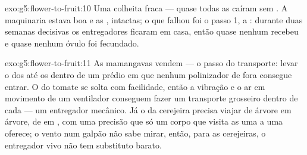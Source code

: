 \begin{solution}{exo:g5:flower-to-fruit:10}
Uma colheita fraca --- quase todas as  caíram sem . A
maquinaria estava boa e as , intactas; o que falhou foi o
passo 1, a : durante duas semanas decisivas os
entregadores ficaram em casa, então quase nenhum  recebeu
 e quase nenhum óvulo foi fecundado.
\end{solution}

\begin{solution}{exo:g5:flower-to-fruit:11}
As mamangavas vendem  --- o passo do transporte: levar o
 dos  até os  dentro de um prédio em que nenhum
polinizador de fora consegue entrar. O  do tomate se solta com
facilidade, então a vibração e o ar em movimento de um ventilador
conseguem fazer um transporte grosseiro dentro de cada  --- um
entregador mecânico. Já o  da cerejeira precisa viajar de
árvore em árvore, de  em , com uma precisão que só um corpo
que visita as  uma a uma oferece; o vento num galpão não sabe
mirar, então, para as cerejeiras, o entregador vivo não tem
substituto barato.
\end{solution}
